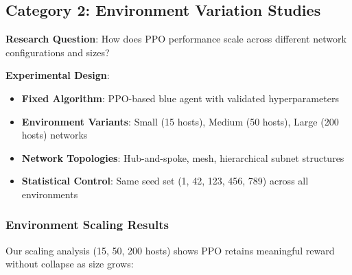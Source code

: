 \documentclass[12pt,twoside]{article}
\theoremstyle{definition}
\theoremstyle{plain}
\begin{document}
\subsection{Category 2: Environment Variation Studies}

\textbf{Research Question}: How does PPO performance scale across different network configurations and sizes?

\textbf{Experimental Design}:
\begin{itemize}
\item \textbf{Fixed Algorithm}: PPO-based blue agent with validated hyperparameters
\item \textbf{Environment Variants}: Small (15 hosts), Medium (50 hosts), Large (200 hosts) networks
\item \textbf{Network Topologies}: Hub-and-spoke, mesh, hierarchical subnet structures
\item \textbf{Statistical Control}: Same seed set (1, 42, 123, 456, 789) across all environments
\end{itemize}

\subsubsection{Environment Scaling Results}

Our scaling analysis (15, 50, 200 hosts) shows PPO retains meaningful reward without collapse as size grows:
\end{document}
